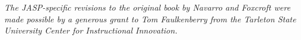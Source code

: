 

\newpage

\vspace*{7cm}
\begin{center}
{\it \large
The JASP-specific revisions to the original book by Navarro and Foxcroft were made possible by a generous grant to Tom Faulkenberry from the Tarleton State University Center for Instructional Innovation.
}
\end{center}

